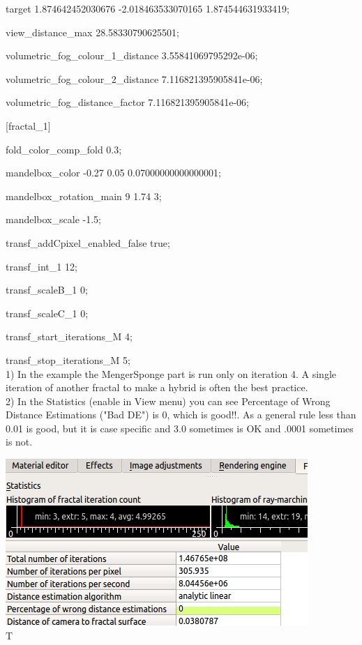 target 1.874642452030676 -2.018463533070165 1.874544631933419;

view\_distance\_max 28.58330790625501;

volumetric\_fog\_colour\_1\_distance 3.55841069795292e-06;

volumetric\_fog\_colour\_2\_distance 7.116821395905841e-06;

volumetric\_fog\_distance\_factor 7.116821395905841e-06;

{[}fractal\_1{]}

fold\_color\_comp\_fold 0.3;

mandelbox\_color -0.27 0.05 0.07000000000000001;

mandelbox\_rotation\_main 9 1.74 3;

mandelbox\_scale -1.5;

transf\_addCpixel\_enabled\_false true;

transf\_int\_1 12;

transf\_scaleB\_1 0;

transf\_scaleC\_1 0;

transf\_start\_iterations\_M 4;

transf\_stop\_iterations\_M 5;\\[2\baselineskip]1) In the example the
MengerSponge part is run only on iteration 4. A single iteration of another
fractal to make a hybrid is often the best practice.\\[2\baselineskip]2) In the
Statistics (enable in View menu) you can see Percentage of Wrong Distance
Estimations ("Bad DE") is 0, which is good!!. As a general rule less than 0.01
is good, but it is case specific and 3.0 sometimes is OK and .0001 sometimes is
not.

\includegraphics[width=4.51024in,height=2.48976in]{img/manual/media/image31.png}\\[2\baselineskip]T

